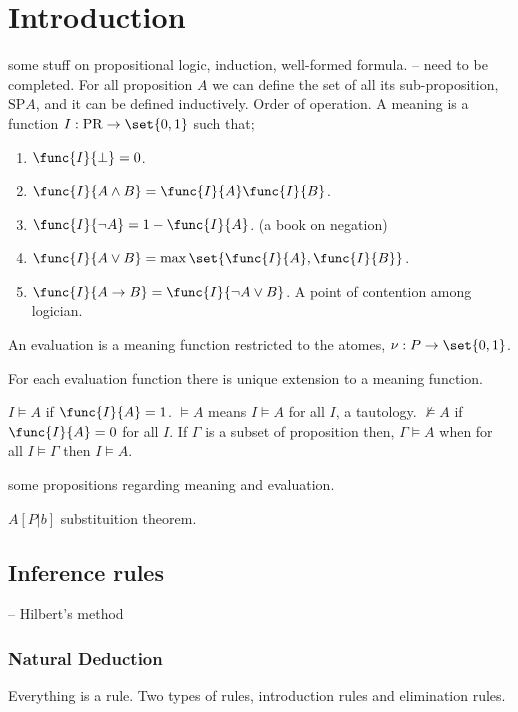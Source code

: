 \chapter{Introduction}
some stuff on propositional logic, induction, well-formed formula. -- need to be completed.
For all proposition \(A\) we can define the set of all its sub-proposition, \(\mathrm{SP} {A}\), and it can be defined inductively. Order of operation. A meaning is a function \(I : \mathrm{PR} \to \set{0,1}\) such that;
\begin{enumerate}
    \item \(\func{I}{\perp} = 0 \).
    \item \(\func{I}{A \land B} = \func{I}{A} \func{I}{B}\).
    \item \(\func{I}{\neg A} = 1 - \func{I}{A}\). (a book on negation)
    \item \(\func{I}{A \lor B} = \max \set{\func{I}{A}, \func{I}{B}}\).
    \item \(\func{I}{A \to B} = \func{I}{\neg A \lor B}\). A point of contention among logician.
\end{enumerate}
An evaluation is a meaning function restricted to the atomes, \(\nu : P \to \set{0,1}\).

\begin{theorem}
    For each evaluation function there is unique extension to a meaning function.
\end{theorem}

\(I \models A\) if \(\func{I}{A} = 1\). \(\models A\) means \(I \models A\) for all \(I\), a tautology. \(\not\models A\) if \(\func{I}{A} = 0\) for all \(I\). If \(\Gamma\) is a subset of proposition then, \(\Gamma \models A\) when for all \(I \models \Gamma\) then \(I \models A\).

some propositions regarding meaning and evaluation.

\(A[P|b]\)
 substituition  theorem.
 \section{Inference rules}
 -- Hilbert's method
 \subsection{Natural Deduction}
 Everything is a rule. Two types of rules, introduction rules and elimination rules.